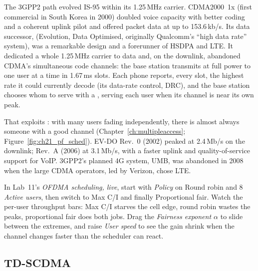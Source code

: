 The 3GPP2 path evolved IS-95 within its 1.25\,MHz carrier. CDMA2000~1x (first commercial in South
Korea in 2000) doubled voice capacity with better coding and a coherent uplink pilot and offered
packet data at up to 153.6\,kb/s. Its data successor,  (Evolution, Data Optimised,
originally Qualcomm's ``high data rate'' system), was a remarkable design and a forerunner of HSDPA
and LTE. It dedicated a whole 1.25\,MHz carrier to data and, on the downlink, abandoned CDMA's
simultaneous code channels: the base station transmits at full power to one user at a time in
1.67\,ms slots. Each phone reports, every slot, the highest rate it could currently decode (its
data-rate control, DRC), and the base station chooses whom to serve with a
, serving each user when its channel is near its own peak.

That exploits : with many users fading independently, there is almost
always someone with a good channel (Chapter~\ref{ch:multipleaccess}; Figure~\ref{fig:ch21_pf_sched}).
EV-DO Rev.~0 (2002) peaked at 2.4\,Mb/s on the downlink; Rev.~A (2006) at 3.1\,Mb/s, with a faster
uplink and quality-of-service support for VoIP. 3GPP2's planned 4G system, UMB, was abandoned in
2008 when the large CDMA operators, led by Verizon, chose LTE.

\begin{tryit}
In Lab~11's \emph{OFDMA scheduling, live}, start with \emph{Policy} on Round robin and 8
\emph{Active users}, then switch to Max C/I and finally Proportional fair. Watch the per-user
throughput bars: Max C/I starves the cell edge, round robin wastes the peaks, proportional fair does
both jobs. Drag the \emph{Fairness exponent $\alpha$} to slide between the extremes, and raise
\emph{User speed} to see the gain shrink when the channel changes faster than the scheduler can
react.
\end{tryit}


\subsection{TD-SCDMA}

